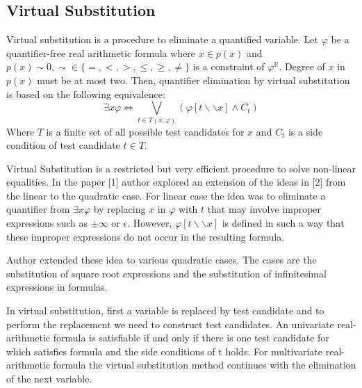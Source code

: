 \subsection{Virtual Substitution}
Virtual substitution is a procedure to eliminate a quantified variable. Let $\varphi$ be a quantifier-free real arithmetic formula where $x\in p(x)$ and $p(x) \sim 0, \sim \in \{=,<,>,\leq,\geq,\neq\}$ is a constraint of   $\varphi^\mathbb{R}$. Degree of $x$ in $p(x)$ must be at most two. Then, quantifier elimination by virtual substitution is based on the following equivalence:
$$ \exists x\varphi \Longleftrightarrow \bigvee\limits_{t\in T(x,\varphi)}  (\varphi [t\backslash\backslash x] \wedge C_t)$$
Where $T$ is a finite set of all possible test candidates for $x$ and $C_t$ is a side condition of test candidate $t \in T$.

Virtual Substitution is a restricted but very efficient procedure to solve non-linear equalities. In the paper [1] author explored an extension of the ideas in [2] from the linear to the quadratic case. For linear case the idea was to eliminate a quantifier from $\exists x \varphi$ by replacing $x$ in $\varphi$ with $t$ that may involve improper expressions such as $\pm \infty$ or $\epsilon$. However, $\varphi [t\backslash\backslash x]$ is defined in such a way that these improper expressions do not occur in the resulting formula.

Author extended these idea to various quadratic cases. The cases are the substitution of square root expressions and the substitution of infinitesimal expressions in formulas.

In virtual substitution, first a variable is replaced by test candidate and to perform the replacement we need to construct test candidates. An univariate real-arithmetic formula is satisfiable if and only if there is one test candidate for which satisfies formula and the side conditions of t holds. For multivariate real-arithmetic formula the virtual substitution method continues with the elimination of the next variable.
